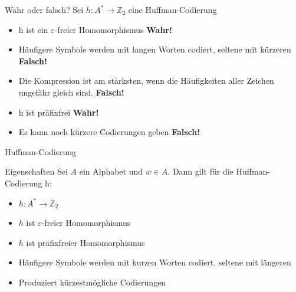 \begin{frame}{Wahr oder falsch?}
	Sei $h: A^* \rightarrow \mathbb{Z}_2$ eine Huffman-Codierung
	\begin{itemize}
		\item h ist ein $\varepsilon$-freier Homomorphismus \pause \textbf{Wahr!}\pause
		\item Häufigere Symbole werden mit langen Worten codiert, seltene mit kürzeren \pause \textbf{Falsch!}\pause
		\item Die Kompression ist am stärksten, wenn die Häufigkeiten aller Zeichen ungefähr gleich sind. \pause \textbf{Falsch!} \pause
		\item h ist präfixfrei \pause \textbf{Wahr!} \pause
		\item Es kann noch kürzere Codierungen geben \pause \textbf{Falsch!}
	\end{itemize}
\end{frame}

	
\begin{frame}{Huffman-Codierung}
	\begin{block}{Eigenschaften}
		Sei $A$ ein Alphabet und $w \in A$. Dann gilt für die Huffman-Codierung h:
		\begin{itemize}
			\item $h: A^* \rightarrow \mathbb{Z}_2$
			\item $h$ ist $\varepsilon$-freier Homomorphismus
			\item $h$ ist präfixfreier Homomorphismus
			\item Häufigere Symbole werden mit kurzen Worten codiert, seltene mit längeren
			\item Produziert kürzestmögliche Codierungen
		\end{itemize}
	\end{block}
\end{frame}


